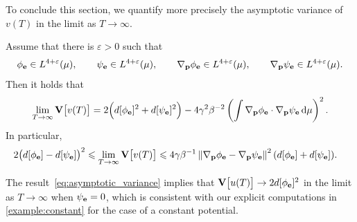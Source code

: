 \documentclass[11pt,a4paper]{article}
\begin{document}
To conclude this section,
we quantify more precisely the asymptotic variance of $v(T)$ in the limit as $T \to \infty$.
\begin{proposition}
    \label{proposition:asymptotic_variance}
    Assume that there is $\varepsilon > 0$ such that
    \begin{equation}
        \label{eq:regularity_solution}
        \phi_{\boldsymbol{\mathbf e}} \in L^{4+\varepsilon}(\mu),
        \qquad
        \psi_{\boldsymbol{\mathbf e}} \in L^{4+\varepsilon}(\mu),
        \qquad
        \nabla_{\boldsymbol{\mathbf p}} \phi_{\boldsymbol{\mathbf e}} \in L^{4+\varepsilon}(\mu),
        \qquad
        \nabla_{\boldsymbol{\mathbf p}} \psi_{\boldsymbol{\mathbf e}} \in L^{4+\varepsilon}(\mu).
    \end{equation}
    Then it holds that
    \begin{equation}
        \label{eq:asymptotic_variance}
        \lim_{T \to \infty} \mathbf{V}\bigl[v(T)\bigr] =
        2 \Bigl( d[\phi_{\boldsymbol{\mathbf e}}]^2 +  d[\psi_{\boldsymbol{\mathbf e}}]^2 \Bigr) - 4 \gamma^2 \beta^{-2} \left( \int \nabla_{\boldsymbol{\mathbf p}} \phi_{\boldsymbol{\mathbf e}} \cdot \nabla_{\boldsymbol{\mathbf p}} \psi_{\boldsymbol{\mathbf e}} \, \mathrm d \mu \right)^2.
    \end{equation}
    In particular,
    \begin{align}
        \label{eq:bounds_asymptotic_variance}
        2\bigl( d[\phi_{\vect e}] - d[\psi_{\vect e}] \bigr)^2
        \leq \lim_{T \to \infty} \var \bigl[v(T)\bigr]
        &\leq 4 \gamma \beta^{-1} \norm{\grad_{\vect p} \phi_{\vect e} - \grad_{\vect p} \psi_{\vect e}}^2 (d[\phi_{\vect e}] + d[\psi_{\vect e}]).
    \end{align}
\end{proposition}
\begin{remark}
    \label{remark:asym_variance_u}
    The result~\eqref{eq:asymptotic_variance} implies that $\mathbf{V}\bigl[u(T)\bigr] \to 2 d[\phi_{\boldsymbol{\mathbf e}}]^2$ in the limit as $T \to \infty$ when $\psi_{\boldsymbol{\mathbf e}} = 0$,
    which is consistent with our explicit computations in \cref{example:constant} for the case of a constant potential.
\end{remark}
\end{document}
